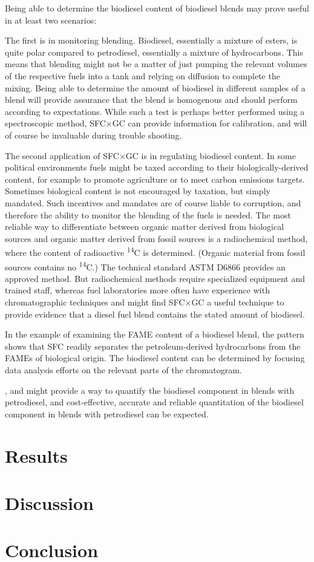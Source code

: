 Being able to determine the biodiesel content of biodiesel blends may prove
useful in at least two scenarios: 

The first is in monitoring blending. Biodiesel, essentially a mixture of esters,
is quite polar compared to petrodiesel, essentially a mixture of hydrocarbons.
This means that blending might not be a matter of just pumping the relevant volumes
of the respective fuels into a tank and relying on diffusion to complete the
mixing. Being able to determine the amount of biodiesel in different samples of
a blend will provide assurance that the blend is homogenous and should perform
according to expectations. While such a test is perhaps better performed using a
spectroscopic method, SFC×GC can provide information for calibration, and will
of course be invaluable during trouble shooting.  

The second application of SFC×GC is in regulating biodiesel content. In some
political environments fuels might be taxed according to their
biologically-derived content, for example to promote agriculture or to meet
carbon emissions targets. Sometimes biological content is not encouraged by
taxation, but simply mandated. Such incentives and mandates are of course liable
to corruption, and therefore the ability to monitor the blending of the fuels is
needed. The most reliable way to differentiate between organic matter derived
from biological sources and organic matter derived from fossil sources is a
radiochemical method, where the content of radioactive \textsuperscript{14}C is
determined. (Organic material from fossil sources contains no
\textsuperscript{14}C.) The technical standard ASTM D6866 provides an approved
method. But radiochemical methods require specialized equipment and trained
staff, whereas fuel laboratories more often have experience with chromatographic
techniques and might find SFC×GC a useful technique to provide evidence that a
diesel fuel blend contains the stated amount of biodiesel.

In the example of examining the FAME content of a biodiesel blend, the pattern
shows that SFC readily separates the petroleum-derived hydrocarbons from the
FAMEs of biological origin. The biodiesel content can be determined by focusing
data analysis efforts on the relevant parts of the chromatogram.

, and might provide a way to quantify the biodiesel component in blends
with petrodiesel, and cost-effective, accurate and reliable quantitation of the
biodiesel component in blends with petrodiesel can be expected.



\section{Results}


\section{Discussion}


\section{Conclusion}

\todos